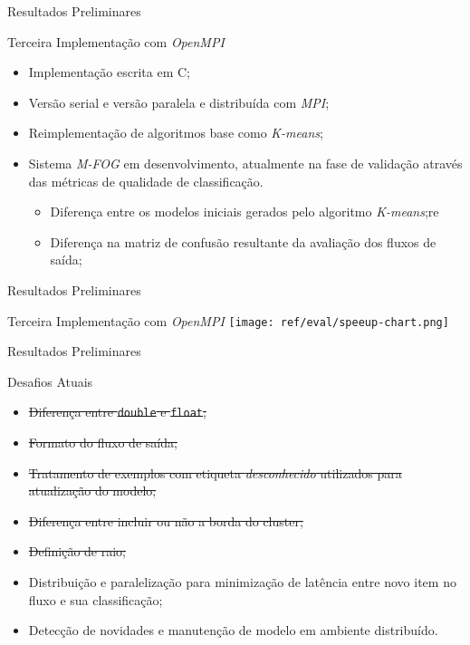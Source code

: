 \documentclass[aspectratio=43,10pt]{beamer}
\begin{document}
\begin{frame}[fragile]{Resultados Preliminares}
  \begin{alertblock}{Terceira Implementação com \textit{OpenMPI}}
    \begin{itemize}%
      \item Implementação escrita em C;
      \item Versão serial e versão paralela e distribuída com \textit{MPI};
      \item Reimplementação de algoritmos base como \textit{K-means};
      \item Sistema \textit{M-FOG} em desenvolvimento, atualmente na fase de
      validação através das métricas de qualidade de classificação.
      \begin{itemize}
        \item Diferença entre os modelos iniciais gerados pelo algoritmo \textit{K-means};re
        \item Diferença na matriz de confusão resultante da avaliação dos fluxos de saída;
      \end{itemize}
    \end{itemize}
  \end{alertblock}
\end{frame}

\begin{frame}[fragile]{Resultados Preliminares}
  \begin{alertblock}{Terceira Implementação com \textit{OpenMPI}}
    \texttt{[image: ref/eval/speeup-chart.png]}
  \end{alertblock}
\end{frame}

\begin{frame}[fragile]{Resultados Preliminares}
  \begin{alertblock}{Desafios Atuais}
    \begin{itemize}
      \item \sout{Diferença entre \texttt{double} e \texttt{float};}
      \item \sout{Formato do fluxo de saída;}
      \item \sout{Tratamento de exemplos com etiqueta \textit{desconhecido} utilizados para atualização do modelo;}
      \item \sout{Diferença entre incluir ou não a borda do cluster;}
      \item \sout{Definição de raio;}
      \item Distribuição e paralelização para minimização de latência entre
      novo item no fluxo e sua classificação;
      \item Detecção de novidades e manutenção de modelo em ambiente distribuído.
    \end{itemize}
  \end{alertblock}
\end{frame}
\end{document}
